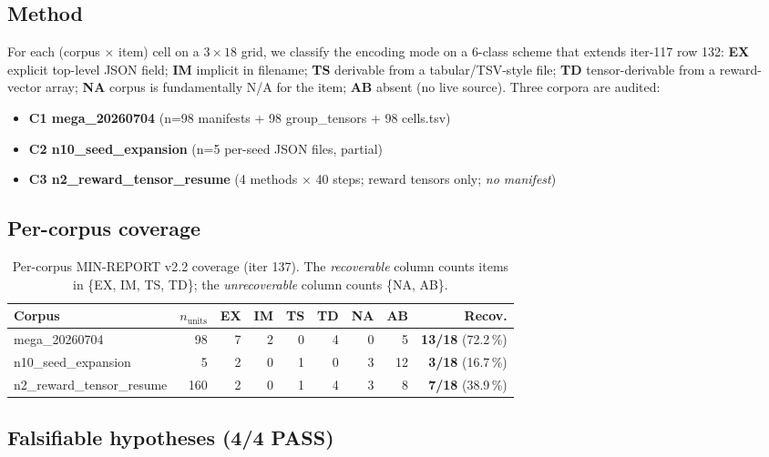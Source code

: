 \documentclass{article}  \usepackage[preprint,nonatbib]{neurips_2026} \usepackage[numbers]{natbib}
\begin{document}
\subsection*{Method}

For each (corpus $\times$ item) cell on a $3 \times 18$ grid, we classify
the encoding mode on a 6-class scheme that extends iter-117 row 132:
\textbf{EX} explicit top-level JSON field; \textbf{IM} implicit in
filename; \textbf{TS} derivable from a tabular/TSV-style file; \textbf{TD}
tensor-derivable from a reward-vector array; \textbf{NA} corpus is
fundamentally N/A for the item; \textbf{AB} absent (no live source).
Three corpora are audited:

\begin{itemize}
  \item \textbf{C1 mega\_20260704} (n=98 manifests + 98 group\_tensors + 98 cells.tsv)
  \item \textbf{C2 n10\_seed\_expansion} (n=5 per-seed JSON files, partial)
  \item \textbf{C3 n2\_reward\_tensor\_resume} (4 methods $\times$ 40 steps; reward tensors only; \emph{no manifest})
\end{itemize}

\subsection*{Per-corpus coverage}

\begin{table}[t]
\centering
\caption{Per-corpus MIN-REPORT v2.2 coverage (iter 137). The
\emph{recoverable} column counts items in \{EX, IM, TS, TD\}; the
\emph{unrecoverable} column counts \{NA, AB\}.}
\label{tab:p5-iter137-corpus}
\small
\begin{tabular}{@{}lrrrrrrrr@{}}
\toprule
Corpus & $n_{\text{units}}$ & EX & IM & TS & TD & NA & AB & Recov. \\
\midrule
mega\_20260704            &  98 & 7 & 2 & 0 & 4 & 0 & 5 & \textbf{13/18} (72.2\,\%) \\
n10\_seed\_expansion      &   5 & 2 & 0 & 1 & 0 & 3 & 12 & \textbf{3/18} (16.7\,\%) \\
n2\_reward\_tensor\_resume & 160 & 2 & 0 & 1 & 4 & 3 & 8 & \textbf{7/18} (38.9\,\%) \\
\bottomrule
\end{tabular}
\end{table}

\subsection*{Falsifiable hypotheses (4/4 PASS)}
\end{document}
